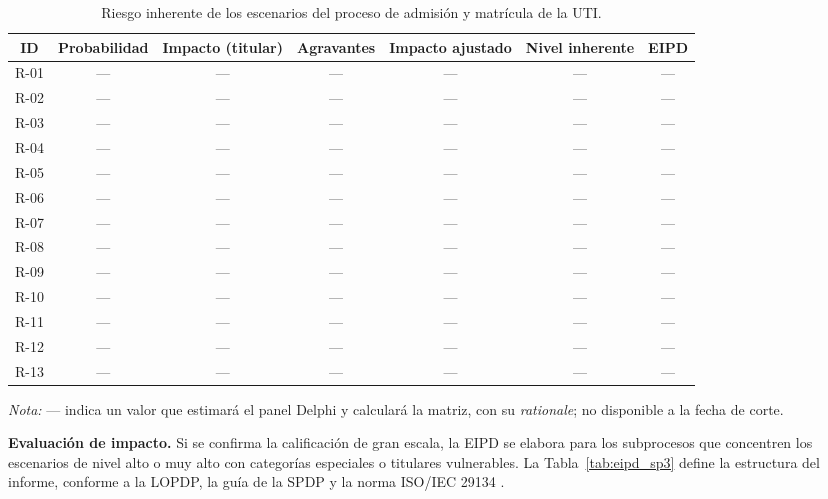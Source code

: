 \begin{table}[htbp]
  \centering
  \caption{Riesgo inherente de los escenarios del proceso de admisión y matrícula de la UTI.}
  \label{tab:riesgo_inherente}
  \scriptsize
  \setlength{\tabcolsep}{3pt}
  \renewcommand{\arraystretch}{1.2}
  \begin{tabular}{|c|c|c|c|c|c|c|}
    \hline
    \textbf{ID} & \textbf{Probabilidad} & \textbf{Impacto (titular)} & \textbf{Agravantes} & \textbf{Impacto ajustado} & \textbf{Nivel inherente} & \textbf{EIPD} \\
    \hline
    R-01 & --- & --- & --- & --- & --- & --- \\ \hline
    R-02 & --- & --- & --- & --- & --- & --- \\ \hline
    R-03 & --- & --- & --- & --- & --- & --- \\ \hline
    R-04 & --- & --- & --- & --- & --- & --- \\ \hline
    R-05 & --- & --- & --- & --- & --- & --- \\ \hline
    R-06 & --- & --- & --- & --- & --- & --- \\ \hline
    R-07 & --- & --- & --- & --- & --- & --- \\ \hline
    R-08 & --- & --- & --- & --- & --- & --- \\ \hline
    R-09 & --- & --- & --- & --- & --- & --- \\ \hline
    R-10 & --- & --- & --- & --- & --- & --- \\ \hline
    R-11 & --- & --- & --- & --- & --- & --- \\ \hline
    R-12 & --- & --- & --- & --- & --- & --- \\ \hline
    R-13 & --- & --- & --- & --- & --- & --- \\ \hline
  \end{tabular}
  \par\vspace{2pt}
  \raggedright
  \textit{Nota:} --- indica un valor que estimará el panel Delphi y calculará la matriz, con su \textit{rationale}; no disponible a la fecha de corte.
  \par\vspace{2pt}
  \raggedright
\end{table}

\textbf{Evaluación de impacto.} Si se confirma la calificación de gran escala, la EIPD se elabora para los subprocesos que concentren los escenarios de nivel alto o muy alto con categorías especiales o titulares vulnerables. La Tabla~\ref{tab:eipd_sp3} define la estructura del informe, conforme a la LOPDP, la guía de la SPDP y la norma ISO/IEC 29134 \cite{lopdp2021,spdp2026guiav2,iso29134_2023}.

